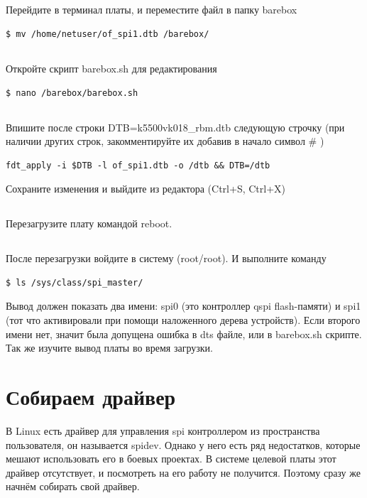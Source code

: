 \subsection{} Перейдите в терминал платы, и переместите файл в папку barebox
\begin{lstlisting}[style=bash]
$ mv /home/netuser/of_spi1.dtb /barebox/
\end{lstlisting}

\subsection{} Откройте скрипт barebox.sh для редактирования
\begin{lstlisting}[style=bash]
$ nano /barebox/barebox.sh
\end{lstlisting}

\subsection{} Впишите после строки DTB=k5500vk018\_rbm.dtb следующую строчку (при наличии других строк, закомментируйте их добавив в начало символ \# )
\begin{lstlisting}[style=stdout]
fdt_apply -i $DTB -l of_spi1.dtb -o /dtb && DTB=/dtb
\end{lstlisting}
Сохраните изменения и выйдите из редактора (Ctrl+S, Ctrl+X)

\subsection{} Перезагрузите плату командой reboot. 

\subsection{} После перезагрузки войдите в систему (root/root). И выполните команду
\begin{lstlisting}[style=bash]
$ ls /sys/class/spi_master/
\end{lstlisting}
Вывод должен показать два имени: spi0 (это контроллер qspi flash-памяти) и spi1 (тот что активировали при помощи наложенного дерева устройств). Если второго имени нет, значит была допущена ошибка в dts файле, или в barebox.sh скрипте. Так же изучите вывод платы во время загрузки. 

\section{Собираем драйвер}
В Linux есть драйвер для управления spi контроллером из пространства пользователя, он называется spidev. Однако у него есть ряд недостатков, которые мешают использовать его в боевых проектах. В системе целевой платы этот драйвер отсутствует, и посмотреть на его работу не получится. Поэтому сразу же начнём собирать свой драйвер.

